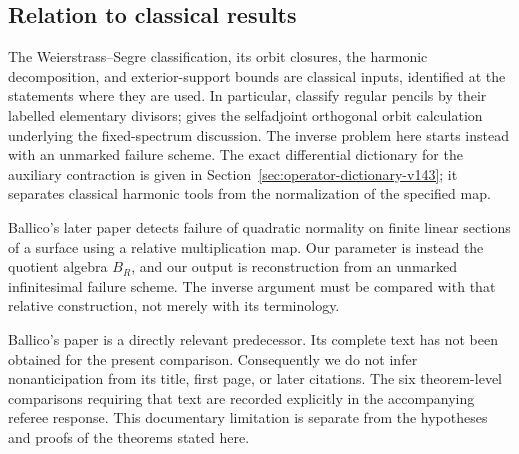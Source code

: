 \subsection{Relation to classical results}
The Weierstrass--Segre classification, its orbit closures, the harmonic
decomposition, and exterior-support bounds are classical inputs,
identified at the statements where they are used.  In particular,
\cite[Theorem~1.1 and Corollary~2.1]{FevolaMandelshtamSturmfels}
classify regular pencils by their labelled elementary divisors;
\cite[equation (2)]{TrevisiolSymmetric} gives the selfadjoint orthogonal orbit
calculation underlying the fixed-spectrum discussion.  The inverse
problem here starts instead with an unmarked failure scheme.
The exact differential dictionary for the auxiliary contraction is
given in Section~\ref{sec:operator-dictionary-v143}; it separates
classical harmonic tools from the normalization of the specified map.

Ballico's later paper \cite[Theorem~0.2; \S1,
Remark~1.2 and equation~(6)]{Ballico96} detects failure of quadratic
normality on finite linear sections of a surface using a relative
multiplication map.  Our parameter is instead the quotient algebra
\(B_R\), and our output is reconstruction from an unmarked
infinitesimal failure scheme.  The inverse argument must be compared
with that relative construction, not merely with its terminology.

Ballico's paper \cite{Ballico93} is a directly relevant predecessor.
Its complete text has not been obtained for the present comparison.
Consequently we do not infer nonanticipation from its title, first
page, or later citations.  The six theorem-level comparisons requiring
that text are recorded explicitly in the accompanying referee response.
This documentary limitation is separate from the hypotheses and proofs
of the theorems stated here.
